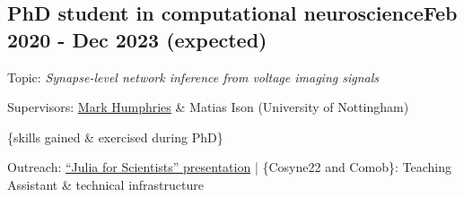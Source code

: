 \vspace*{4pt}
\subsection {{PhD student in computational neuroscience}\hfill Feb 2020 - Dec 2023 (expected)}
\vspace*{4pt}

Topic: {\large\emph{Synapse-level network inference from voltage imaging signals}}
\vspace*{4pt}

Supervisors: \href{https://www.humphries-lab.org/}{Mark Humphries} \& Matias Ison (University of Nottingham)
\vspace*{4pt}

\{skills gained \& exercised during PhD\}
\vspace*{4pt}

Outreach:
\href{https://tomasfiers.net/posts/julia-for-scientists/}{``Julia for Scientists'' presentation} | \{Cosyne22 and Comob\}: Teaching Assistant \& technical infrastructure
